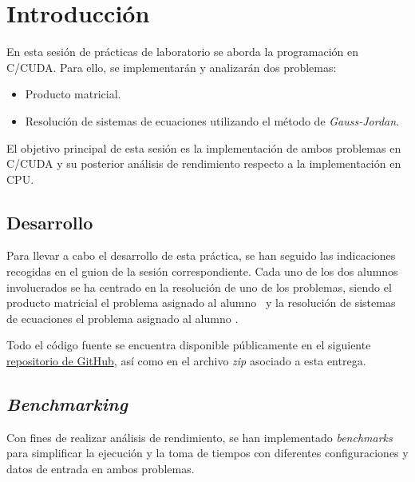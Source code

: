 \pagestyle{fancy}
\fancyhead[LO]{\autorR}
\fancyhead[LE]{\autorA}
\fancyhead[RE,RO]{\textit{\rightmark}}
\fancyfoot[L]{\asignaturaAbbr}
\fancyfoot[R]{\fecha}

\section{Introducción} \label{sec:1}
En esta sesión de prácticas de laboratorio se aborda la programación en C/CUDA. Para ello, se implementarán y analizarán 
dos problemas:
\vspace{0.1cm}
\begin{itemize}
    \item Producto matricial.
    \item Resolución de sistemas de ecuaciones utilizando el método de \textit{Gauss-Jordan}.
\end{itemize}
\vspace{0.1cm}
El objetivo principal de esta sesión es la implementación de ambos problemas en C/CUDA y su posterior análisis de rendimiento 
respecto a la implementación en CPU.

\subsection{Desarrollo}
Para llevar a cabo el desarrollo de esta práctica, se han seguido las indicaciones recogidas en el guion de la sesión correspondiente.
Cada uno de los dos alumnos involucrados se ha centrado en la resolución de uno de los problemas, 
siendo el producto matricial el problema asignado al alumno \autorR\ y la resolución de sistemas de ecuaciones el problema
asignado al alumno \autorA.

Todo el código fuente se encuentra disponible públicamente en el siguiente 
\href{https://github.com/alexrolo/CAP-CUDA}{repositorio de GitHub}, así como en el archivo \textit{zip} asociado a esta entrega.

\subsection{\textit{Benchmarking}}
Con fines de realizar análisis de rendimiento, se han implementado \textit{benchmarks} para simplificar la ejecución y la toma 
de tiempos con diferentes configuraciones y datos de entrada en ambos problemas.

